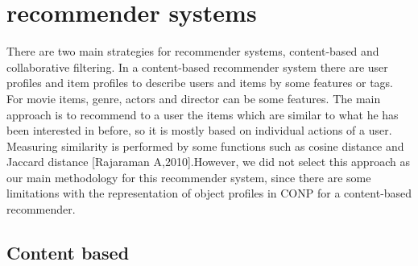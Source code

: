 







\section{recommender systems}
There are two main strategies for recommender systems, content-based and collaborative filtering. In a content-based recommender system there are user profiles and item profiles to describe users and items by some features or tags. For movie items, genre, actors and director can be some features. The main approach is to recommend to a user the items which are similar to what he has been interested in before, so it is mostly based on individual actions of a user. Measuring similarity is performed by some functions such as cosine distance and Jaccard distance [Rajaraman A,2010].However, we did not select this approach as our main methodology for this recommender system, since there are some limitations with the representation of object profiles in CONP for a content-based recommender.

\subsection{Content based}
